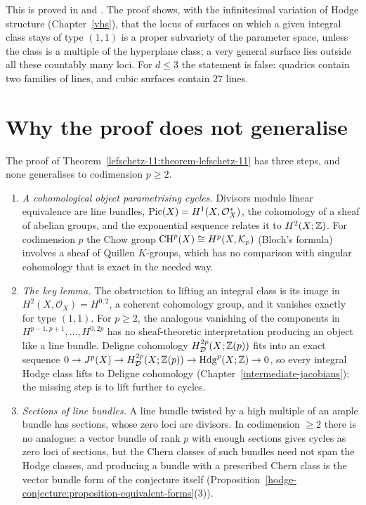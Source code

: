 This is proved in \cite{voisin-hodge-2} and \cite{griffiths-harris-noether-lefschetz}. The proof shows, with the infinitesimal variation of Hodge structure (Chapter~\ref{vhs}), that
the locus of surfaces on which a given integral class stays of type $(1,1)$ is a proper subvariety of the parameter space, unless the class is a multiple of the hyperplane class; a
very general surface lies outside all these countably many loci. For $d \leq 3$ the statement is false: quadrics contain two families of lines, and cubic surfaces contain $27$ lines.

\section{Why the proof does not generalise}\label{lefschetz-11:section-why-not}

\begin{remark}\label{lefschetz-11:remark-why-not}
The proof of Theorem~\ref{lefschetz-11:theorem-lefschetz-11} has three steps, and none generalises to codimension $p \geq 2$.
\begin{enumerate}
\item \emph{A cohomological object parametrising cycles.} Divisors modulo linear equivalence are line bundles, $\operatorname{Pic}(X) = H^1(X, \mathcal{O}_X^*)$, the cohomology of a sheaf of abelian
groups, and the exponential sequence relates it to $H^2(X; \mathbb{Z})$. For codimension $p$ the Chow group $\operatorname{CH}^p(X) \cong H^p(X, \mathcal{K}_p)$ (Bloch's formula) involves a sheaf of Quillen
$K$-groups, which has no comparison with singular cohomology that is exact in the needed way.
\item \emph{The key lemma.} The obstruction to lifting an integral class is its image in $H^2(X, \mathcal{O}_X) = H^{0,2}$, a coherent cohomology group, and it vanishes exactly for type $(1,1)$. For
$p \geq 2$, the analogous vanishing of the components in $H^{p-1,p+1}, \ldots, H^{0,2p}$ has no sheaf-theoretic interpretation producing an object like a line bundle. Deligne cohomology
$H^{2p}_{\mathcal{D}}(X; \mathbb{Z}(p))$ fits into an exact sequence $0 \to J^p(X) \to H^{2p}_{\mathcal{D}}(X; \mathbb{Z}(p)) \to \mathrm{Hdg}^p(X; \mathbb{Z}) \to 0$, so every integral Hodge class lifts to Deligne
cohomology (Chapter~\ref{intermediate-jacobians}); the missing step is to lift further to cycles.
\item \emph{Sections of line bundles.} A line bundle twisted by a high multiple of an ample bundle has sections, whose zero loci are divisors. In codimension $\geq 2$ there is no
analogue: a vector bundle of rank $p$ with enough sections gives cycles as zero loci of sections, but the Chern classes of such bundles need not span the Hodge classes, and producing a
bundle with a prescribed Chern class is the vector bundle form of the conjecture itself (Proposition~\ref{hodge-conjecture:proposition-equivalent-forms}(3)).
\end{enumerate}
\end{remark}

